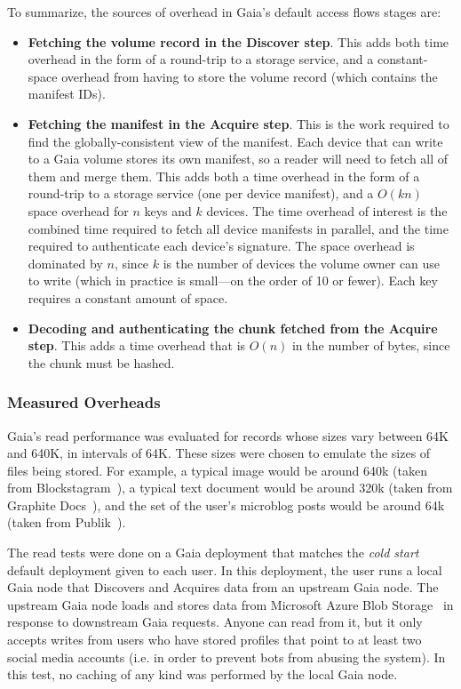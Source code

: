 To summarize, the sources of overhead in Gaia's default access flows stages are:

\begin{itemize}
\item \textbf{Fetching the volume record in the Discover step}.  This adds both time overhead in
the form of a round-trip to a storage service, and a constant-space overhead from having
to store the volume record (which contains the manifest IDs).
\item \textbf{Fetching the manifest in the Acquire step}.  This
is the work required to find the globally-consistent view of the manifest.
Each device that can write to a Gaia volume stores its own manifest, so a reader
will need to fetch all of them and merge them.  This adds both a time
overhead in the form of a round-trip to a storage service (one per device
manifest), and a $O(kn)$ space overhead for $n$ keys and $k$ devices.  The time overhead of
interest is the combined time
required to fetch all device manifests in parallel, and the time required to authenticate
each device's signature.  The space
overhead is dominated by $n$, since $k$ is the number of devices the volume
owner can use to write (which in practice is small---on the order of 10 or fewer).
Each key requires a constant amount of space.
\item \textbf{Decoding and authenticating the chunk fetched from the Acquire
step}. This adds a time overhead that is $O(n)$ in the number of bytes, since the chunk must
be hashed.
\end{itemize}

\subsubsection{Measured Overheads}

Gaia's read performance was evaluated for records whose sizes vary between 64K
and 640K, in intervals of 64K.  These sizes
were chosen to emulate the sizes of files being stored.  For example, a typical
image would be around 640k (taken from Blockstagram~\cite{blockstagram}),
a typical text document would be around 320k (taken from Graphite
Docs~\cite{graphite-docs}), and the set of the user's
microblog posts would be around 64k (taken from Publik~\cite{publik}).

The read tests were done on a Gaia deployment that matches the \emph{cold start}
default deployment given to each user.
In this deployment, the user runs a local Gaia node that Discovers and Acquires data
from an upstream Gaia node.  The upstream Gaia node loads and stores data from
Microsoft Azure Blob Storage~\cite{azure-blob-storage} in response to downstream
Gaia requests.  Anyone can read from it, but it only accepts writes from users
who have stored profiles that point to at least two social media accounts (i.e.
in order to prevent bots from abusing the system).  In this test, no caching of
any kind was performed by the local Gaia node.

